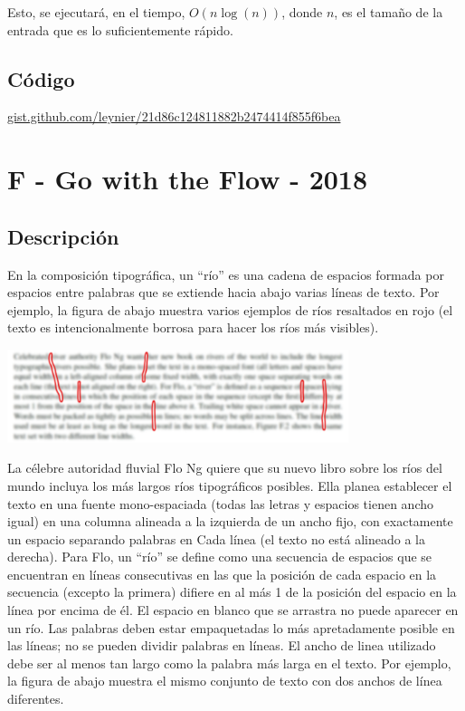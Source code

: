 \documentclass[12pt]{article}
\newcommand{\nl}{\vspace{0.3cm}}
\begin{document}
\nl

Esto, se ejecutará, en el tiempo, $O(n\log(n))$, donde $n$, es el tamaño de la entrada que es lo suficientemente rápido.

\subsection{Código}

\href{https://gist.github.com/leynier/21d86c124811882b2474414f855f6bea}{gist.github.com/leynier/21d86c124811882b2474414f855f6bea}

\section{F - Go with the Flow - 2018}

\subsection{Descripción}

En la composición tipográfica, un “río” es una cadena de espacios formada por espacios entre palabras que se extiende hacia abajo varias líneas de texto. Por ejemplo, la figura de abajo muestra varios ejemplos de ríos resaltados en rojo (el texto es
intencionalmente borrosa para hacer los ríos más visibles).

\begin{center}
	\includegraphics[width=10cm]{images/image1.png}
\end{center}

La célebre autoridad fluvial Flo Ng quiere que su nuevo libro sobre los ríos del mundo incluya los más largos ríos tipográficos posibles. Ella planea establecer el texto en una fuente mono-espaciada (todas las letras y espacios tienen ancho igual) en una columna alineada a la izquierda de un ancho fijo, con exactamente un espacio separando palabras en
Cada línea (el texto no está alineado a la derecha). Para Flo, un “río” se define como una secuencia de espacios que se encuentran en líneas consecutivas en las que la posición de cada espacio en la secuencia (excepto la primera) difiere en al más 1 de la posición del espacio en la línea por encima de él. El espacio en blanco que se arrastra no puede aparecer en un río. Las palabras deben estar empaquetadas lo más apretadamente posible en las líneas; no se pueden dividir palabras en líneas. El ancho de linea utilizado debe ser al menos tan largo como la palabra más larga en el texto. Por ejemplo, la figura de abajo muestra el mismo conjunto de texto con dos anchos de línea diferentes.
\end{document}
